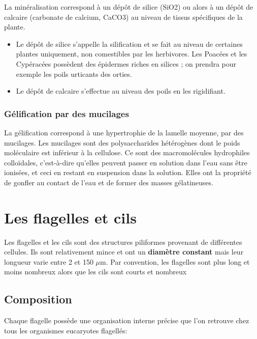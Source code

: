 \documentclass[
]{book}
\providecommand{\tightlist}{%
  \setlength{\itemsep}{0pt}\setlength{\parskip}{0pt}}
\begin{document}
La minéralisation correspond à un dépôt de silice (SiO2) ou alors à un dépôt de calcaire (carbonate de calcium, CaCO3) au niveau de tissus spécifiques de la plante.

\begin{itemize}
\tightlist
\item
  Le dépôt de silice s'appelle la silification et se fait au niveau de certaines plantes
  uniquement, non comestibles par les herbivores. Les Poacées et les Cypéracées
  possèdent des épidermes riches en silices ; on prendra pour exemple les poils urticants
  des orties.
\item
  Le dépôt de calcaire s'effectue au niveau des poils en les rigidifiant.
\end{itemize}

\hypertarget{guxe9lification-par-des-mucilages}{%
\subsubsection{Gélification par des mucilages}\label{guxe9lification-par-des-mucilages}}

La gélification correspond à une hypertrophie de la lamelle moyenne, par des mucilages. Les mucilages sont des polysaccharides hétérogènes dont le poids moléculaire est inférieur à la cellulose. Ce sont des macromolécules hydrophiles colloïdales, c'est-à-dire qu'elles peuvent passer en solution dans l'eau sans être ionisées, et ceci en restant en suspension dans la solution. Elles ont la propriété de gonfler au contact de l'eau et de former des masses gélatineuses.

\hypertarget{les-flagelles-et-cils}{%
\section{Les flagelles et cils}\label{les-flagelles-et-cils}}

Les flagelles et les cils sont des structures piliformes provenant de différentes cellules. Ils sont relativement mince et ont un \textbf{diamètre constant} mais leur longueur varie entre 2 et 150 \(\mu\)m. Par convention, les flagelles sont plus long et moins nombreux alors que les cils sont courts et nombreux

\hypertarget{composition-1}{%
\subsection{Composition}\label{composition-1}}

Chaque flagelle possède une organisation interne précise que l'on retrouve chez tous les organismes eucaryotes flagellés:
\end{document}

